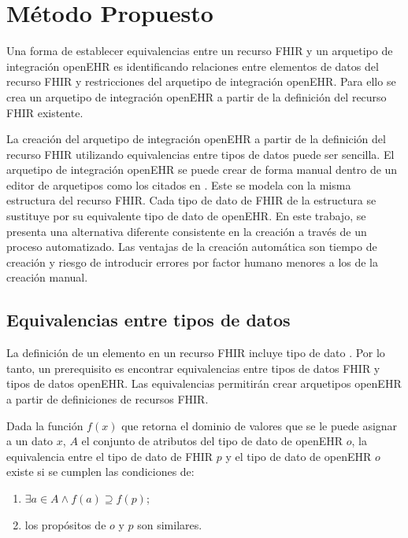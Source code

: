 \chapter{Método Propuesto}

Una forma de establecer equivalencias entre un recurso FHIR y un arquetipo de integración openEHR es identificando relaciones entre elementos de datos del recurso FHIR y restricciones del arquetipo de integración openEHR. Para ello se crea un arquetipo de integración openEHR a partir de la definición del recurso FHIR existente.

La creación del arquetipo de integración openEHR a partir de la definición del recurso FHIR utilizando equivalencias entre tipos de datos puede ser sencilla. El arquetipo de integración openEHR se puede crear de forma manual dentro de un editor de arquetipos como los citados en \cite{openEHRModellingTools}. Este se modela con la misma estructura del recurso FHIR. Cada tipo de dato de FHIR de la estructura se sustituye por su equivalente tipo de dato de openEHR. En este trabajo, se presenta una alternativa diferente consistente en la creación a través de un proceso automatizado. Las ventajas de la creación automática son tiempo de creación y riesgo de introducir errores por factor humano menores a los de la creación manual.

\section{Equivalencias entre tipos de datos}

La definición de un elemento en un recurso FHIR incluye tipo de dato \cite{FHIRElement}. Por lo tanto, un prerequisito es encontrar equivalencias entre tipos de datos FHIR y tipos de datos openEHR. Las equivalencias permitirán crear arquetipos openEHR a partir de definiciones de recursos FHIR.

Dada la función \( f(x) \) que retorna el dominio de valores que se le puede asignar a un dato \( x \), \( A \) el conjunto de atributos del tipo de dato de openEHR \( o \), la equivalencia entre el tipo de dato de FHIR \( p \)  y el tipo de dato de openEHR \( o \) existe si se cumplen las condiciones de:

\begin{enumerate}
  \item \( \exists a \in A \land f(a) \supseteq f(p) \);
  \item los propósitos de \( o \) y \( p \) son similares.
\end{enumerate}

